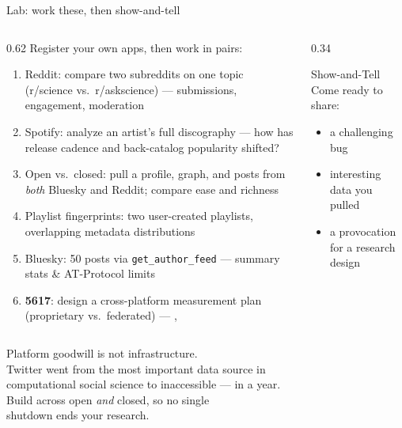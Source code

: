 \documentclass[9pt,aspectratio=169]{beamer}
\begin{document}
\begin{frame}{Lab: work these, then show-and-tell}
    \begin{columns}[T]
        \begin{column}{0.62\textwidth}
            Register your own apps, then work in pairs:
            \begin{enumerate}\small
                \item Reddit: compare two subreddits on one topic (r/science vs.\ r/askscience) --- submissions, engagement, moderation
                \item Spotify: analyze an artist's full discography --- how has release cadence and back-catalog popularity shifted?
                \item Open vs.\ closed: pull a profile, graph, and posts from \textit{both} Bluesky and Reddit; compare ease and richness
                \item Playlist fingerprints: two user-created playlists, overlapping metadata distributions
                \item Bluesky: 50 posts via \texttt{get\_author\_feed} --- summary stats \& AT-Protocol limits
                \item[6.] \textcolor{tab-purple}{\textbf{5617}}: design a cross-platform measurement plan (proprietary vs.\ federated) --- \textcite{bruns2019after}, \textcite{davidson2023platform}
            \end{enumerate}
        \end{column}
        \begin{column}{0.34\textwidth}
            \begin{block}{Show-and-Tell}
                \footnotesize Come ready to share:
                \begin{itemize}\footnotesize
                    \item a challenging bug
                    \item interesting data you pulled
                    \item a provocation for a research design
                \end{itemize}
            \end{block}
        \end{column}
    \end{columns}
\end{frame}

\begin{frame}[standout]
    Platform goodwill is not infrastructure.\\[0.6em]
    Twitter went from the most important data source in\\
    computational social science to inaccessible --- in a year.\\[1em]
    {\large Build across open \emph{and} closed, so no single\\ shutdown ends your research.}
\end{frame}
\end{document}

